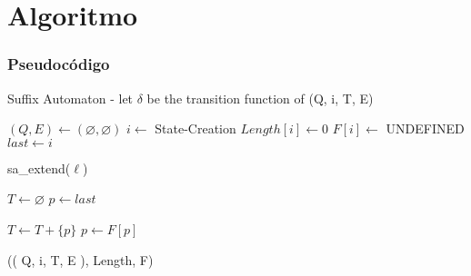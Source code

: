 \section{Algoritmo}\label{Algorithm}

\subsubsection{Pseudocódigo}


\begin{alg}
	Suffix Automaton - let $\delta$ be the transition function of (Q, i, T, E)
	\begin{algorithmic}[1]
		
			\State $(Q, E) \leftarrow (\varnothing, \varnothing)$
			\State $i \leftarrow$ State-Creation
			\State $Length[i] \leftarrow 0$
			\State $F[i] \leftarrow$ UNDEFINED
			\State $last \leftarrow i$
			
				\State  sa\_extend($\ell$)
			\EndFor
			
			\State $T \leftarrow \varnothing$
			\State $p \leftarrow last$
			
				\State $T \leftarrow T + \{p\}$
				\State $p \leftarrow F[p]$
			\EndWhile
			
			\State \Return (( Q, i, T, E ), Length, F)		
		\EndFunction
		
	\end{algorithmic}
\end{alg}


